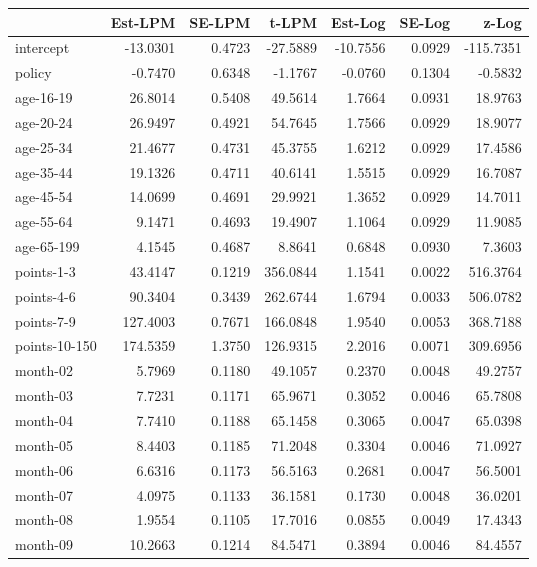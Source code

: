 \documentclass[10pt]{article}
\begin{document}
\begin{table}[ht]
\centering
\begin{tabular}{lrrrrrr}
  \hline
 & Est-LPM & SE-LPM & t-LPM & Est-Log & SE-Log & z-Log \\ 
  \hline
intercept & -13.0301 & 0.4723 & -27.5889 & -10.7556 & 0.0929 & -115.7351 \\ 
  policy & -0.7470 & 0.6348 & -1.1767 & -0.0760 & 0.1304 & -0.5832 \\ 
  age-16-19 & 26.8014 & 0.5408 & 49.5614 & 1.7664 & 0.0931 & 18.9763 \\ 
  age-20-24 & 26.9497 & 0.4921 & 54.7645 & 1.7566 & 0.0929 & 18.9077 \\ 
  age-25-34 & 21.4677 & 0.4731 & 45.3755 & 1.6212 & 0.0929 & 17.4586 \\ 
  age-35-44 & 19.1326 & 0.4711 & 40.6141 & 1.5515 & 0.0929 & 16.7087 \\ 
  age-45-54 & 14.0699 & 0.4691 & 29.9921 & 1.3652 & 0.0929 & 14.7011 \\ 
  age-55-64 & 9.1471 & 0.4693 & 19.4907 & 1.1064 & 0.0929 & 11.9085 \\ 
  age-65-199 & 4.1545 & 0.4687 & 8.8641 & 0.6848 & 0.0930 & 7.3603 \\ 
  points-1-3 & 43.4147 & 0.1219 & 356.0844 & 1.1541 & 0.0022 & 516.3764 \\ 
  points-4-6 & 90.3404 & 0.3439 & 262.6744 & 1.6794 & 0.0033 & 506.0782 \\ 
  points-7-9 & 127.4003 & 0.7671 & 166.0848 & 1.9540 & 0.0053 & 368.7188 \\ 
  points-10-150 & 174.5359 & 1.3750 & 126.9315 & 2.2016 & 0.0071 & 309.6956 \\ 
  month-02 & 5.7969 & 0.1180 & 49.1057 & 0.2370 & 0.0048 & 49.2757 \\ 
  month-03 & 7.7231 & 0.1171 & 65.9671 & 0.3052 & 0.0046 & 65.7808 \\ 
  month-04 & 7.7410 & 0.1188 & 65.1458 & 0.3065 & 0.0047 & 65.0398 \\ 
  month-05 & 8.4403 & 0.1185 & 71.2048 & 0.3304 & 0.0046 & 71.0927 \\ 
  month-06 & 6.6316 & 0.1173 & 56.5163 & 0.2681 & 0.0047 & 56.5001 \\ 
  month-07 & 4.0975 & 0.1133 & 36.1581 & 0.1730 & 0.0048 & 36.0201 \\ 
  month-08 & 1.9554 & 0.1105 & 17.7016 & 0.0855 & 0.0049 & 17.4343 \\ 
  month-09 & 10.2663 & 0.1214 & 84.5471 & 0.3894 & 0.0046 & 84.4557 \\ 

\end{tabular}
\end{table}
\end{document}
